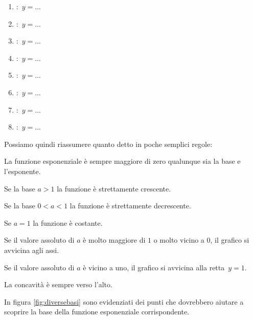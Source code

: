 \vspace{5pt}

\noindent \begin{minipage}{.69\textwidth}
 \begin{inaccessibleblock}
  \espdiversebasi
\end{inaccessibleblock}
\end{minipage}
\hspace{12pt}
\begin{minipage}{.20\textwidth}
 \begin{enumerate} [label=\alph*]
   \item :~\(y=...\)
   \item :~\(y=...\)
   \item :~\(y=...\)
   \item :~\(y=...\)
   \item :~\(y=...\)
   \item :~\(y=...\)
   \item :~\(y=...\)
   \item :~\(y=...\)
 \end{enumerate}
\end{minipage}


Possiamo quindi riassumere quanto detto in poche semplici regole: 
\begin{enumerate*}
 \item La funzione esponenziale è sempre maggiore di zero qualunque sia la 
base e l'esponente.
 \item Se la base \(a>1\) la funzione è strettamente crescente.
 \item Se la base \(0<a<1\) la funzione è strettamente decrescente.
 \item Se \(a=1\) la funzione è costante.
 \item Se il valore assoluto di \(a\) è molto maggiore di \(1\) o
molto vicino a \(0\), il grafico si avvicina agli assi.
 \item Se il valore assoluto di \(a\) è vicino a uno, il grafico si 
avvicina alla 
retta~\(y=1\).
 \item La concavità è sempre verso l'alto.
\end{enumerate*}

In figura \ref{fig:diversebasi} sono evidenziati dei punti che dovrebbero 
aiutare a scoprire la base della funzione esponenziale corrispondente.

